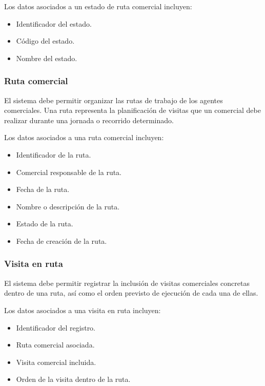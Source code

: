 Los datos asociados a un estado de ruta comercial incluyen:

\begin{itemize}
    \item Identificador del estado.
    \item Código del estado.
    \item Nombre del estado.
\end{itemize}

\subsubsection*{Ruta comercial}

El sistema debe permitir organizar las rutas de trabajo de los agentes comerciales. Una ruta representa la planificación de visitas que un comercial debe realizar durante una jornada o recorrido determinado.

Los datos asociados a una ruta comercial incluyen:

\begin{itemize}
    \item Identificador de la ruta.
    \item Comercial responsable de la ruta.
    \item Fecha de la ruta.
    \item Nombre o descripción de la ruta.
    \item Estado de la ruta.
    \item Fecha de creación de la ruta.
\end{itemize}

\subsubsection*{Visita en ruta}

El sistema debe permitir registrar la inclusión de visitas comerciales concretas dentro de una ruta, así como el orden previsto de ejecución de cada una de ellas.

Los datos asociados a una visita en ruta incluyen:

\begin{itemize}
    \item Identificador del registro.
    \item Ruta comercial asociada.
    \item Visita comercial incluida.
    \item Orden de la visita dentro de la ruta.
\end{itemize}

